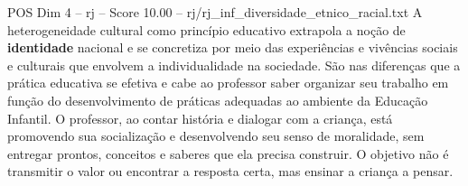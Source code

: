 \begin{textsample}{POS Dim 4 – rj – Score 10.00 – rj/rj\_inf\_diversidade\_etnico\_racial.txt}
A heterogeneidade cultural como princípio educativo extrapola a noção de \textbf{identidade} nacional e se concretiza por meio das experiências e vivências sociais e culturais que envolvem a individualidade na sociedade.
São nas diferenças que a prática educativa se efetiva e cabe ao professor saber organizar seu trabalho em função do desenvolvimento de práticas adequadas ao ambiente da Educação Infantil.
O professor, ao contar história e dialogar com a criança, está promovendo sua socialização e desenvolvendo seu senso de moralidade, sem entregar prontos, conceitos e saberes que ela precisa construir.
O objetivo não é transmitir o valor ou encontrar a resposta certa, mas ensinar a criança a pensar.

\end{textsample}
